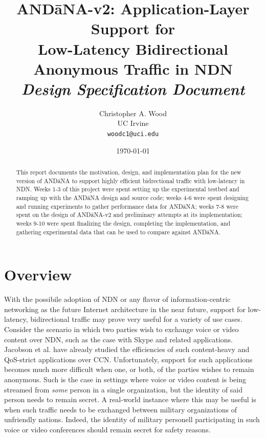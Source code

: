 \documentclass[10pt]{article}
\begin{document}
\title{{\sf AND\=aNA-v2}: Application-Layer Support for \\ Low-Latency Bidirectional Anonymous Traffic in NDN \\ \emph{Design Specification Document}}
\author{Christopher A. Wood \\ UC Irvine \\ {\tt woodc1@uci.edu}}
\date{\today}
\maketitle

\begin{abstract}
This report documents the motivation, design, and implementation plan for the new version of {\sf AND\=aNA} to support highly efficient bidrectional traffic with low-latency in NDN. Weeks 1-3 of this project were spent setting up the experimental testbed and ramping up with the {\sf AND\=aNA} design and source code; weeks 4-6 were spent designing and running experiments to gather performance data for {\sf AND\=aNA}; weeks 7-8 were spent on the design of {\sf AND\=aNA-v2} and preliminary attempts at its implementation; weeks 9-10 were spent finalizing the design, completing the implementation, and gathering experimental data that can be used to compare against {\sf AND\=aNA}.
\end{abstract}


\section{Overview} \label{sec:overview}
With the possibile adoption of NDN or any flavor of information-centric networking as the future Internet architecture in the near future, support for low-latency, bidirectional traffic may prove very useful for a variety of use cases. Consider the scenario in which two parties wish to exchange voice or video content over NDN, such as the case with Skype and related applications. Jacobson et al. \cite{voccn} have already studied the efficiencies of such content-heavy and QoS-strict applications over CCN. Unfortunately, support for such applications becomes much more difficult when one, or both, of the parties wishes to remain anonymous. Such is the case in settings where voice or video content is being streamed from \emph{some} person in a single organization, but the identity of said person needs to remain secret. A real-world instance where this may be useful is when such traffic needs to be exchanged between military organizations of unfriendly nations. Indeed, the identity of military personell participating in such voice or video conferences should remain secret for safety reasons. 
\end{document}
